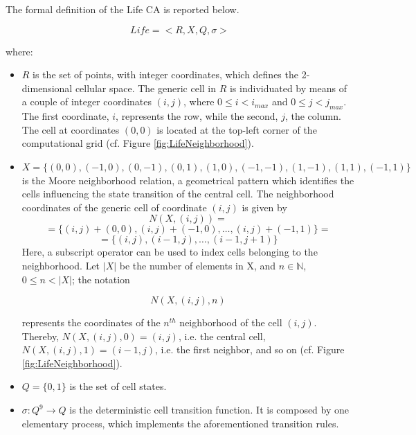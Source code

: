The formal definition of the Life CA is reported below.

$$Life = < R, X, Q, \sigma >$$

where:

\begin{itemize}

\item $R$ is the set of points, with integer coordinates, which
  defines the 2-dimensional cellular space. The generic cell in $R$ is
  individuated by means of a couple of integer coordinates $(i, j)$,
  where $0 \leq i < i_{max}$ and $0 \leq j < j_{max}$. The first
  coordinate, $i$, represents the row, while the second, $j$, the
  column. The cell at coordinates $(0,0)$ is located at the top-left
  corner of the computational grid (cf. Figure
  \ref{fig:LifeNeighborhood}).

\item $X = \{(0,0), (-1, 0), (0, -1), (0, 1), (1, 0), (-1,-1), (1,-1),
  (1,1), (-1,1)\}$ is the Moore neighborhood relation, a geometrical
  pattern which identifies the cells influencing the state transition
  of the central cell. The neighborhood coordinates of the generic
  cell of coordinate $(i, j)$ is given by
  $$N(X, (i, j)) = $$
  $$= \{(i, j)+(0,0), (i, j)+(-1, 0), \dots, (i, j)+(-1,1)\} =$$
  $$= \{(i, j), (i-1, j), \dots, (i-1,j+1)\}$$
  Here, a subscript operator can be used to index cells belonging to the
  neighborhood. Let $|X|$ be the number of elements in X, and $n \in
  \mathbb{N}$, $0 \leq n < |X|$; the notation

  $$N(X, (i, j), n)$$

  represents the coordinates of the $n^{th}$ neighborhood of the cell
  $(i,j)$. Thereby, $N(X, (i, j), 0) = (i, j)$, i.e. the central cell,
  $N(X, (i, j), 1) = (i-1, j)$, i.e. the first neighbor, and so on
  (cf. Figure \ref{fig:LifeNeighborhood}).

\item $Q = \{0, 1\}$ is the set of cell states.

\item $\sigma : Q^9 \rightarrow Q$ is the deterministic cell
  transition function. It is composed by one elementary process, which
  implements the aforementioned transition rules.
\end{itemize}






